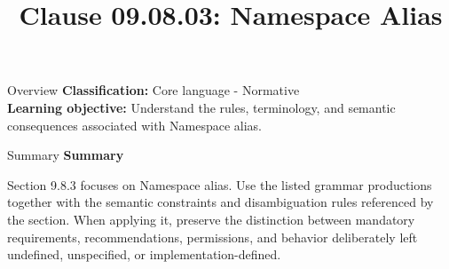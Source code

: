 \documentclass[10pt,letterpaper]{article}
\title{Clause 09.08.03: Namespace Alias}
\author{}
\date{}
\begin{document}
\maketitle
\begin{CornellOverviewBox}{Overview}
\textbf{Classification:} Core language - Normative\\[2pt]
\textbf{Learning objective:} Understand the rules, terminology, and semantic consequences associated with Namespace alias.
\end{CornellOverviewBox}\begin{CornellSummaryBox}{Summary}
{\sffamily\bfseries\color{Accent} Summary}\par\vspace{3pt}Section 9.8.3 focuses on Namespace alias. Use the listed grammar productions together with the semantic constraints and disambiguation rules referenced by the section. When applying it, preserve the distinction between mandatory requirements, recommendations, permissions, and behavior deliberately left undefined, unspecified, or implementation-defined.
\end{CornellSummaryBox}
\end{document}
